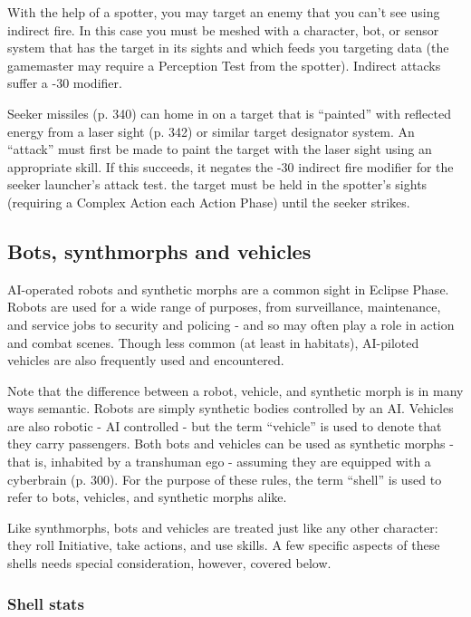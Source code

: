 With the help of a spotter, you may target an enemy that you can’t see using indirect fire. In this case you must be meshed with a character, bot, or sensor system that has the target in its sights and which feeds you targeting data (the gamemaster may require a Perception Test from the spotter). Indirect attacks suffer a -30 modifier.

Seeker missiles (p. 340) can home in on a target that is ``painted'' with reflected energy from a laser sight (p. 342) or similar target designator system. An ``attack'' must first be made to paint the target with the laser sight using an appropriate skill. If this succeeds, it negates the -30 indirect fire modifier for the seeker launcher’s attack test. the target must be held in the spotter’s sights (requiring a Complex Action each Action Phase) until the seeker strikes.


\subsection{Bots, synthmorphs and vehicles}
\label{sec:bots-synthmorphs-vehicles}

AI-operated robots and synthetic morphs are a common sight in Eclipse Phase. Robots are used for a wide range of purposes, from surveillance, maintenance, and service jobs to security and policing -  and so may often play a role in action and combat scenes. Though less common (at least in habitats), AI-piloted vehicles are also frequently used and encountered.

Note that the difference between a robot, vehicle, and synthetic morph is in many ways semantic. Robots are simply synthetic bodies controlled by an AI. Vehicles are also robotic - AI controlled -  but the term ``vehicle'' is used to denote that they carry passengers. Both bots and vehicles can be used as synthetic morphs -  that is, inhabited by a transhuman ego -  assuming they are equipped with a cyberbrain (p. 300). For the purpose of these rules, the term ``shell'' is used to refer to bots, vehicles, and synthetic morphs alike.

Like synthmorphs, bots and vehicles are treated just like any other character: they roll Initiative, take actions, and use skills. A few specific aspects of these shells needs special consideration, however, covered below.

\subsubsection{Shell stats}

